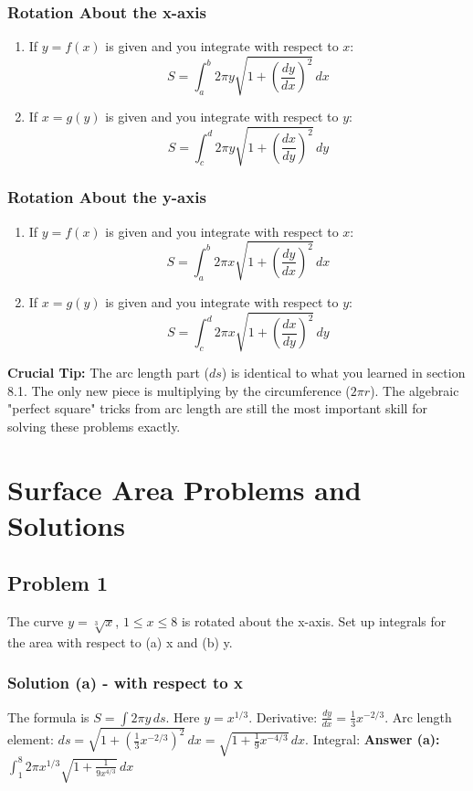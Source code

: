 \documentclass{article}
\begin{document}
\subsubsection*{Rotation About the x-axis}
\begin{enumerate}
    \item If $y=f(x)$ is given and you integrate with respect to $x$:
    \[ S = \int_{a}^{b} 2\pi y \sqrt{1 + \left(\frac{dy}{dx}\right)^2} \,dx \]
    \item If $x=g(y)$ is given and you integrate with respect to $y$:
    \[ S = \int_{c}^{d} 2\pi y \sqrt{1 + \left(\frac{dx}{dy}\right)^2} \,dy \]
\end{enumerate}

\subsubsection*{Rotation About the y-axis}
\begin{enumerate}
    \item If $y=f(x)$ is given and you integrate with respect to $x$:
    \[ S = \int_{a}^{b} 2\pi x \sqrt{1 + \left(\frac{dy}{dx}\right)^2} \,dx \]
    \item If $x=g(y)$ is given and you integrate with respect to $y$:
    \[ S = \int_{c}^{d} 2\pi x \sqrt{1 + \left(\frac{dx}{dy}\right)^2} \,dy \]
\end{enumerate}

\textbf{Crucial Tip:} The arc length part ($ds$) is identical to what you learned in section 8.1. The only new piece is multiplying by the circumference ($2\pi r$). The algebraic "perfect square" tricks from arc length are still the most important skill for solving these problems exactly.

\section{Surface Area Problems and Solutions}

\subsection{Problem 1}
The curve $y = \sqrt[3]{x}$, $1 \le x \le 8$ is rotated about the x-axis. Set up integrals for the area with respect to (a) x and (b) y.
\subsubsection*{Solution (a) - with respect to x}
The formula is $ S = \int 2\pi y \,ds $. Here $y = x^{1/3}$.
Derivative: $ \frac{dy}{dx} = \frac{1}{3}x^{-2/3} $.
Arc length element: $ ds = \sqrt{1 + (\frac{1}{3}x^{-2/3})^2} \,dx = \sqrt{1 + \frac{1}{9}x^{-4/3}} \,dx $.
Integral:
\textbf{Answer (a):} $ \int_{1}^{8} 2\pi x^{1/3} \sqrt{1 + \frac{1}{9x^{4/3}}} \,dx $
\end{document}
